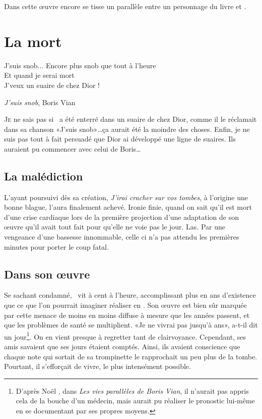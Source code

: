Dans cette \oe{}uvre encore se tisse un parallèle entre un personnage du livre et
\BV.


\section{La mort}
\epigraph{%
J'suis snob... Encore plus snob que tout à l'heure\\%
Et quand je serai mort\\%
J'veux un suaire de chez Dior !%
}{\emph{J'suis snob}, Boris Vian}

\lettrine{J}e ne sais pas si \BV\ a été enterré dans un suaire de chez Dior,
comme il le réclamait dans sa chanson «J'suis snob»\ldots ça aurait été la
moindre des choses. Enfin, je ne suis pas tout à fait persuadé que Dior
ai développé une ligne de suaires. Ils auraient pu commencer avec celui
de Boris\ldots

\subsection{La malédiction}
L'ayant poursuivi dès sa création, \emph{J'irai cracher sur vos tombes}, à
l'origine une bonne blague, l'aura finalement achevé. Ironie finie, quand
on sait qu'il est mort d'une crise cardiaque lors de la première
projection d'une adaptation de son \oe{}uvre qu'il avait tout fait pour
qu'elle ne voie pas le jour. Las. Par une vengeance d'une bassesse innommable,
celle ci n'a pas attendu les premières minutes pour porter le coup fatal.

\subsection{Dans son \oe{}uvre}
Se sachant condamné, \BV\ vit à cent à l'heure, accomplissant plus en  ans
d'existence que ce que l'on pourrait imaginer réaliser en . Son \oe{}uvre 
est bien sûr marquée par cette menace de moins en moins diffuse à mesure que 
les années passent, et que les problèmes de santé se multiplient. «Je ne
vivrai pas jusqu'à  ans», a-t-il dit un jour\footnote{D'après Noël , dans \emph{Les vies parallèles de Boris Vian}, il n'aurait pas appris cela de la bouche d'un médecin, mais aurait pu réaliser le pronostic lui-même en se documentant par ses propres moyens.}. On en vient presque à
regretter tant de clairvoyance. Cependant, ses amis savaient que ses jours
étaient comptés. Ainsi, ils avaient conscience que chaque note qui sortait
de sa trompinette le rapprochait un peu plus de la tombe. Pourtant, il
s'efforçait de vivre, le plus intensément possible.

